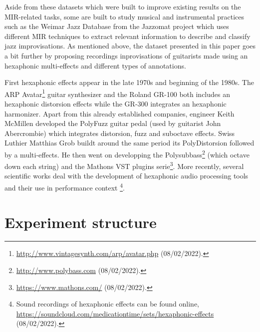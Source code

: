\documentclass{article}
\begin{document}
Aside from these datasets which were built to improve existing results on the MIR-related tasks, some are built to study musical and instrumental practices such as the Weimar Jazz Database \cite{Pfleiderer:2017:BOOK} from the Jazzomat project \cite{Frieler:2013:Jazzomat} which uses different MIR techniques to extract relevant information to describe and classify jazz improvisations. As mentioned above, the dataset presented in this paper goes a bit further by proposing recordings inprovisations of guitarists made using an hexaphonic multi-effects and different types of annotations.

First hexaphonic effects appear in the late 1970s and beginning of the 1980s. The ARP Avatar\footnote{\url{http://www.vintagesynth.com/arp/avatar.php} (08/02/2022).} guitar synthesizer and the Roland GR-100\cite{joness-gr100} both includes an hexaphonic distorsion effects while the GR-300\cite{joness-gr300} integrates an hexaphonic harmonizer. Apart from this already established companies, engineer Keith McMillen developed the PolyFuzz\cite{McMillen2015-timeline} guitar pedal (used by guitarist John Abercrombie) which integrates distorsion, fuzz and suboctave effects. Swiss Luthier Matthias Grob buildt around the same period its PolyDistorsion \cite{grob:paradisGuitar} followed by a multi-effects. He then went on developping the Polysubbass\footnote{\url{http://www.polybass.com} (08/02/2022).} (which octave down each string) and the Mathons VST plugins serie\footnote{\url{https://www.mathons.com/} (08/02/2022).}.
More recently, several scientific works deal with the development of hexaphonic audio processing tools \cite{sci:Puckette2007, sci:Reboursiere2010} and their use in performance context \cite{Reboursiere2020_Puzzle_fr,sci:Graham2012, Bates2009}\footnote{Sound recordings of hexaphonic effects can be found online, \url{https://soundcloud.com/medicationtime/sets/hexaphonic-effects} (08/02/2022).}.


\section{Experiment structure}\label{sec:exp_structure}
\end{document}
